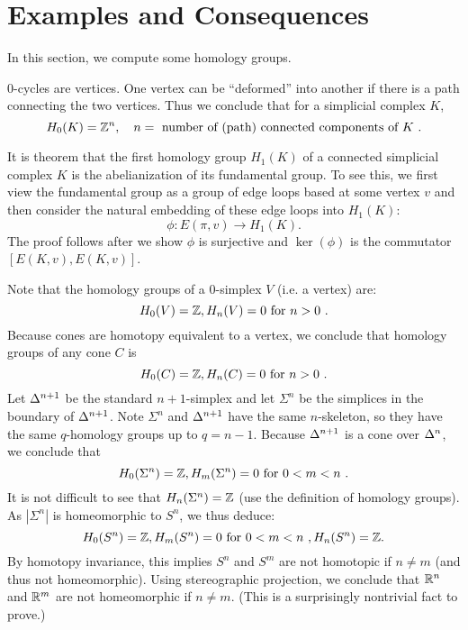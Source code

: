 \section{Examples and Consequences}
In this section, we compute some homology groups.

$0$-cycles are vertices. One vertex can be ``deformed'' into another if there is a path connecting the two vertices. Thus we conclude that for a simplicial complex $K$,
\[
    H_0(K) = {\mathbb Z}^n, \quad n = \text{ number of (path) connected components of $K$ }.
\]

It is theorem that the first homology group $H_1(K)$ of a connected simplicial complex $K$ is the abelianization of its fundamental group. To see this, we first view the fundamental group as a group of edge loops based at some vertex $v$ and then consider the natural embedding of these edge loops into $H_1(K)$:
\[
    \phi: E(\pi,v) \to H_1(K).
\]
The proof follows after we show $\phi$ is surjective and $\ker(\phi)$ is the commutator $[E(K,v), E(K,v)]$.

Note that the homology groups of a 0-simplex $V$ (i.e. a vertex) are:
\[
    H_0(V) = {\mathbb Z}, H_n(V) = 0 \text{ for $n > 0$ }.
\]
Because cones are homotopy equivalent to a vertex, we conclude that homology groups of any cone $C$ is
\[
    H_0(C) = {\mathbb Z}, H_n(C) = 0 \text{ for $n > 0$ }.
\]
Let $\Delta^{n+1}$ be the standard $n+1$-simplex and let $\Sigma^n$ be the simplices in the boundary of $\Delta^{n+1}$. Note $\Sigma^n$ and $\Delta^{n+1}$ have the same $n$-skeleton, so they have the same $q$-homology groups up to $q = n - 1$. Because $\Delta^{n+1}$ is a cone over $\Delta^n$, we conclude that
\[
    H_0(\Sigma^n) = {\mathbb Z}, H_m(\Sigma^n) = 0 \text{ for $0 < m < n$ }.
\]
It is not difficult to see that $H_n(\Sigma^n) = {\mathbb Z}$ (use the definition of homology groups). As $|\Sigma^n|$ is homeomorphic to $S^n$, we thus deduce:
\[
    H_0(S^n) = {\mathbb Z}, H_m(S^n) = 0 \text{ for $0 < m < n$ }, H_n(S^n) = {\mathbb Z}.
\]
By homotopy invariance, this implies $S^n$ and $S^m$ are not homotopic if $n \neq m$ (and thus not homeomorphic). Using stereographic projection, we conclude that ${\mathbb R}^n$ and ${\mathbb R}^m$ are not homeomorphic if $n \neq m$. (This is a surprisingly nontrivial fact to prove.)